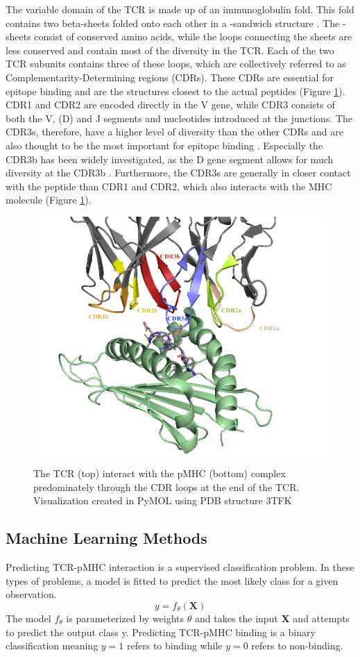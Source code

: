The variable domain of the TCR is made up of an immunoglobulin fold. This fold contains two beta-sheets folded onto each other in a {\textbeta}-sandwich structure \cite{Bork1994TheCore}. The {\textbeta}-sheets consist of conserved amino acids, while the loops connecting the sheets are less conserved and contain most of the diversity in the TCR. Each of the two TCR subunits contains three of these loops, which are collectively referred to as Complementarity-Determining regions (CDRs). These CDRs are essential for epitope binding and are the structures closest to the actual peptides (Figure \ref{fig:tcr_xray}). CDR1 and CDR2 are encoded directly in the V gene, while  CDR3 consists of both the V, (D) and J segments and nucleotides introduced at the junctions. The CDR3s, therefore, have a higher level of diversity than the other CDRs and are also thought to be the most important for epitope binding \cite{Tsuchiya2016TheLoops}. Especially the CDR3b has been widely investigated, as the D gene segment allows for much diversity at the CDR3b \cite{Rossjohn2015TMolecules}. Furthermore, the CDR3s are generally in closer contact with the peptide than CDR1 and CDR2, which also interacts with the MHC molecule (Figure \ref{fig:tcr_xray}).
\begin{figure}
    \centering
    \includegraphics[width=0.65\linewidth]{figures/tcr_pmhc_xray.png}
    \caption{The TCR (top) interact with the pMHC (bottom) complex predominately through the CDR loops at the end of the TCR. Visualization created in PyMOL \cite{SchrodingerLLC2015The1.8} using PDB structure 3TFK \cite{Adams2011TComplex}}
    \label{fig:tcr_xray}
\end{figure}

\subsection{Machine Learning Methods}
Predicting TCR-pMHC interaction is a supervised classification problem. In these types of problems, a model is fitted to predict the most likely class for a given observation.
$$ y = f_{\theta}(\textbf{X})$$
The model $f_{\theta}$ is parameterized by weights $\theta$ and takes the input \textbf{X} and attempts to predict the output class y. Predicting TCR-pMHC binding is a binary classification meaning $y=1$ refers to binding while $y=0$ refers to non-binding.

